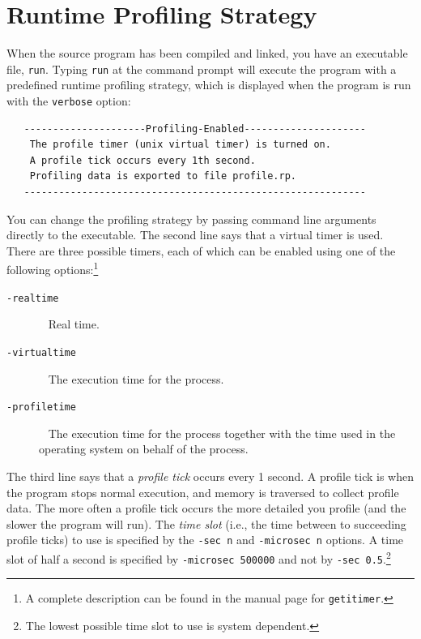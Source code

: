 \documentclass[12pt]{book}
\begin{document}
\section{Runtime Profiling Strategy}
When the source program has been compiled and linked, you have an
executable file, \texttt{run}. Typing \texttt{run} at the command prompt will
execute the program with a predefined 
%
runtime profiling strategy, which is displayed when the program is
run with the {\tt verbose} option:
\begin{verbatim}
   ---------------------Profiling-Enabled---------------------
    The profile timer (unix virtual timer) is turned on.
    A profile tick occurs every 1th second.
    Profiling data is exported to file profile.rp.
   -----------------------------------------------------------
\end{verbatim}
You can change the 
%
profiling strategy by passing command line arguments directly to the
executable.  The second line says that a virtual timer is used. There
are three possible timers, each of which can be enabled using one of
the following options:\footnote{A complete description can be
    found in the manual page for \texttt{getitimer}.}
\begin{description}
\item[{\tt -realtime}]~
  Real time.
\item[{\tt -virtualtime}]~ 
  The execution time for the process.
\item[{\tt -profiletime}]~
  The execution time for the process together with the time used in
  the operating system on behalf of the process.
\end{description}

The third line says that a 
%
{\em profile tick\/} occurs every 1 second.  A profile tick is when
the program stops normal execution, and memory is traversed to collect
profile data. The more often a profile tick occurs the more detailed
you profile (and the slower the program will run). The
%
{\em time slot\/} (i.e., the time between to succeeding profile ticks) to use
is specified by the 
%
\texttt{-sec n} and 
%
\texttt{-microsec n} options. A time slot of half a second is
specified by \texttt{-microsec 500000} and not by \texttt{-sec
  0.5}.\footnote{The lowest possible time slot to use is system
  dependent. 
}
\end{document}
